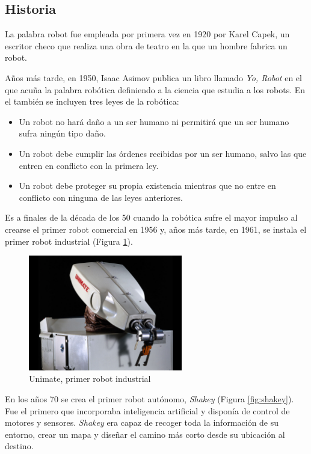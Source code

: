 \subsection{Historia}
La palabra robot fue empleada por primera vez en 1920 por Karel Capek, un escritor checo que realiza una obra de teatro en la que un hombre fabrica un robot. 

Años más tarde, en 1950, Isaac Asimov publica un libro llamado \textit{Yo, Robot} en el que acuña la palabra robótica definiendo a la ciencia que estudia a los robots. En el también se incluyen tres leyes de la robótica:
\begin{itemize}
    \item Un robot no hará daño a un ser humano ni permitirá que un ser humano sufra ningún tipo daño.
    \item Un robot debe cumplir las órdenes recibidas por un ser humano, salvo las que entren en conflicto con la primera ley.
    \item Un robot debe proteger su propia existencia mientras que no entre en conflicto con ninguna de las leyes anteriores. 
\end{itemize}{}

Es a finales de la década de los 50 cuando la robótica sufre el mayor impulso al crearse el primer robot comercial en 1956 y, años más tarde, en 1961, se instala el primer robot industrial (Figura \ref{fig:unimate}).  

\begin{figure}[H]
\centering
\includegraphics[width=0.6\textwidth]{img/unimate.jpg}
\caption{Unimate, primer robot industrial} \label{fig:unimate}
\end{figure}

En los años 70 se crea el primer robot autónomo, \textit{Shakey}  (Figura \ref{fig:shakey}). Fue el primero que incorporaba inteligencia artificial y disponía de control de motores y sensores. \textit{Shakey} era capaz de recoger toda la información de su entorno, crear un mapa y diseñar el camino más corto desde su ubicación al destino. 

